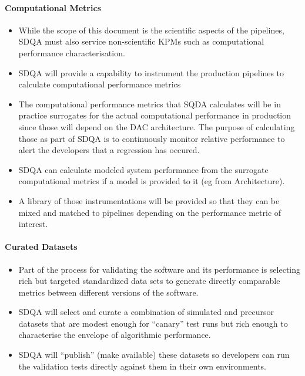 \paragraph{Computational Metrics}
\label{sec:qaComputational}
\begin{itemize}

\item While the scope of this document is the scientific aspects of the pipelines, SDQA must also service non-scientific KPMs such as computational performance characterisation.

\item SDQA will provide a capability to instrument the production  pipelines to calculate computational performance metrics

\item The computational performance metrics that SQDA calculates will be in practice surrogates for the actual computational performance in production since those will depend on the DAC architecture. The purpose of calculating those as part of SDQA is to continuously monitor relative performance to alert the developers that a regression has occured.

\item SDQA can calculate modeled system performance from the surrogate computational metrics if a model is provided to it (eg from Architecture).

\item A library of those instrumentations will be provided so that they can be mixed and matched to pipelines depending on the performance metric of interest.

\end{itemize}


\paragraph{Curated Datasets}
\label{sec:qaCurateddata}
\begin{itemize}

\item Part of the process for validating the software and its performance is selecting rich but targeted standardized data sets to generate directly comparable metrics between different versions of the software.

\item SDQA will select and curate a combination of simulated and precursor datasets that are modest enough for ``canary'' test runs but rich enough to characterise the envelope of algorithmic performance.

\item SDQA will ``publish'' (make available) these datasets so developers can run the validation tests directly against them in their own environments.

\end{itemize}


